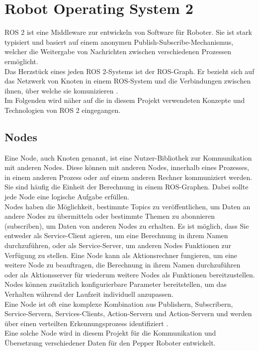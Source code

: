 \section{Robot Operating System 2}\label{sec:ROS2}
\ac{ROS} 2 ist eine Middleware zur entwickeln von Software für Roboter. Sie ist stark typisiert und basiert auf einem anonymen Publish-Subscribe-Mechanismus, welcher die Weitergabe von Nachrichten zwischen verschiedenen Prozessen ermöglicht.\\
Das Herzstück eines jeden \ac{ROS} 2-Systems ist der \ac{ROS}-Graph. Er bezieht sich auf das Netzwerk von Knoten in einem \ac{ROS}-System und die Verbindungen zwischen ihnen, über welche sie komunizieren \cite{ROSBasicConcepts}.\\
Im Folgenden wird näher auf die in diesem Projekt verwendeten Konzepte und Technologien von \ac{ROS} 2 eingegangen.\\

\subsection{Nodes}\label{subsec:ROS2Nodes}
Eine Node, auch Knoten genannt, ist eine Nutzer-Bibliothek zur Kommunikation mit anderen Nodes. Diese können mit anderen Nodes, innerhalb eines Prozesses, in einem anderen Prozess oder auf einem anderen Rechner kommuniziert werden. Sie sind häufig die Einheit der Berechnung in einem \ac{ROS}-Graphen. Dabei sollte jede Node eine logische Aufgabe erfüllen.\\
Nodes haben die Möglichkeit, bestimmte Topics zu veröffentlichen, um Daten an andere Nodes zu übermitteln oder bestimmte Themen zu abonnieren (subscriben), um Daten von anderen Nodes zu erhalten. Es ist möglich, dass Sie entweder als Service-Client agieren, um eine Berechnung in ihrem Namen durchzuführen, oder als Service-Server, um anderen Nodes Funktionen zur Verfügung zu stellen. Eine Node kann als Aktionsrechner fungieren, um eine weitere Node zu beauftragen, die Berechnung in ihrem Namen durchzuführen oder als Aktionsserver für wiederum weitere Nodes als Funktionen bereitzustellen. Nodes können zusätzlich konfigurierbare Parameter bereitstellen, um das Verhalten während der Laufzeit individuell anzupassen.\\
Eine Node ist oft eine komplexe Kombination aus Publishern, Subscribern, Service-Servern, Services-Clients, Action-Servern und Action-Servern und werden über einen verteilten Erkennungsprozess identifiziert \cite{ROSNodes}.\\
Eine solche Node wird in diesem Projekt für die Kommunikation und Übersetzung verschiedener Daten für den Pepper Roboter entwickelt.\\

